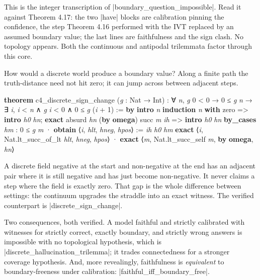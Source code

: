 \documentclass{memoir}
\begin{document}
This is the integer transcription of \LeanVerb|boundary_question_impossible|. Read it
against Theorem 4.17: the two \LeanVerb|have| blocks are calibration pinning the
confidence, the step Theorem 4.16 performed with the IVT replaced by an assumed
boundary value; the last lines are faithfulness and the sign clash. No topology
appears. Both the continuous and antipodal trilemmata factor through this core.

How would a discrete world produce a boundary value? Along a finite path the
truth-distance need not hit zero; it can jump across between adjacent steps.

\begin{LeanVerbatim}
\textbf{theorem} c4_discrete_sign_change (\textit{g} : Nat → Int) :
    ∀ \textit{n}, \textit{g} 0 < 0 → 0 ≤ \textit{g} \textit{n} → ∃ \textit{i}, \textit{i} < \textit{n} ∧ \textit{g} \textit{i} < 0 ∧ 0 ≤ \textit{g}
    (\textit{i} + 1) := \textbf{by}
  \textbf{intro} \textit{n}
  \textbf{induction} \textit{n} \textbf{with}
   zero => \textbf{intro} \textit{h0} \textit{hn}; \textbf{exact} absurd \textit{hn} (\textbf{by} \textbf{omega})
   succ \textit{m} \textit{ih} =>
    \textbf{intro} \textit{h0} \textit{hn}
    \textbf{by_cases} \textit{hm} : 0 ≤ \textit{g} \textit{m}
    · \textbf{obtain} ⟨\textit{i}, \textit{hlt}, \textit{hneg}, \textit{hpos}⟩ := \textit{ih} \textit{h0} \textit{hm}
      \textbf{exact} ⟨\textit{i}, Nat.lt_succ_of_lt \textit{hlt}, \textit{hneg}, \textit{hpos}⟩
    · \textbf{exact} ⟨\textit{m}, Nat.lt_succ_self \textit{m}, \textbf{by} \textbf{omega}, \textit{hn}⟩

\end{LeanVerbatim}


A discrete field negative at the start and non-negative at the end has an
adjacent pair where it is still negative and has just become non-negative. It
never claims a step where the field is exactly zero. That gap is the whole
difference between settings: the continuum upgrades the straddle into an exact
witness. The verified counterpart is \LeanVerb|discrete_sign_change|.

Two consequences, both verified. A model faithful and strictly calibrated with
witnesses for strictly correct, exactly boundary, and strictly wrong answers is
impossible with no topological hypothesis, which is
\LeanVerb|discrete_hallucination_trilemma|; it trades connectedness for a stronger
coverage hypothesis. And, more revealingly, faithfulness is \emph{equivalent} to
boundary-freeness under calibration: \LeanVerb|faithful_iff_boundary_free|.
\end{document}
